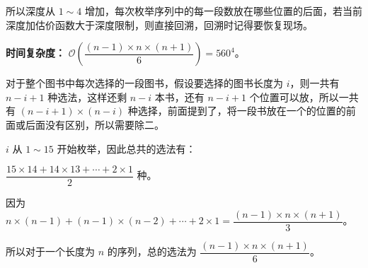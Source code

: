 所以深度从 $1 \sim 4$ 增加，每次枚举序列中的每一段数放在哪些位置的后面，若当前深度加估价函数大于深度限制，则直接回溯，回溯时记得要恢复现场。

\textbf{时间复杂度：} $\mathcal{O}(\dfrac{(n - 1) \times n \times (n + 1)}{6}) = 560^4$。

对于整个图书中每次选择的一段图书，假设要选择的图书长度为 $i$，则一共有 $n - i + 1$ 种选法，这样还剩 $n - i$ 本书，还有 $n - i + 1$ 个位置可以放，所以一共有 $(n - i + 1) \times (n - i)$ 种选择，前面提到了，将一段书放在一个的位置的前面或后面没有区别，所以需要除二。

$i$ 从 $1 \sim 15$ 开始枚举，因此总共的选法有：

$\dfrac{15 \times 14 + 14 \times 13 + \cdots + 2 \times 1}{2}$ 种。

因为 $n \times (n - 1) + (n - 1) \times (n - 2) + \cdots + 2 \times 1 = \dfrac{(n - 1) \times n \times (n + 1)}{3}$。

所以对于一个长度为 $n$ 的序列，总的选法为 $\dfrac{(n - 1) \times n \times (n + 1)}{6}$。

